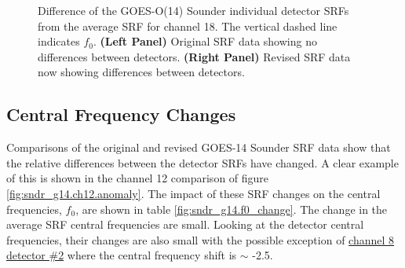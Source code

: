 \begin{figure}[htp]
\begin{tabular}{c c}
  \end{tabular}
  \caption{Difference of the GOES-O(14) Sounder individual detector SRFs from the average SRF for channel 18. The vertical dashed line indicates $f_0$. \textbf{(Left Panel)} Original SRF data showing no differences between detectors. \textbf{(Right Panel)} Revised SRF data now showing differences between detectors.}
  \label{fig:sndr_g14.ch18.dsrf_anomaly}
\end{figure}


\subsection{Central Frequency Changes}
Comparisons of the original and revised GOES-14 Sounder SRF data show that the relative differences between the detector SRFs have changed. A clear example of this is shown in the channel 12 comparison of figure \ref{fig:sndr_g14.ch12.anomaly}. The impact of these SRF changes on the central frequencies, $f_0$, are shown in table \ref{fig:sndr_g14.f0_change}. The change in the average SRF central frequencies are small. Looking at the detector central frequencies, their changes are also small with the possible exception of \hyperref[fig:sndr_g14.ch7-12]{channel 8 detector \#2} where the central frequency shift is $\sim$ -2.5\invcm{}.

